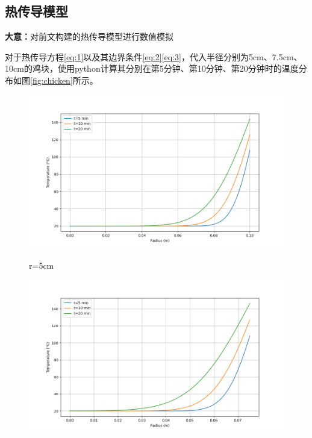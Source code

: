 \documentclass[12pt]{article}
\begin{document}
\subsection{热传导模型}
\begin{summarybox}
	\textbf{大意：}对前文构建的热传导模型进行数值模拟
\end{summarybox}
对于热传导方程\eqref{eq:1}以及其边界条件\eqref{eq:2}\eqref{eq:3}，代入半径分别为5cm、7.5cm、10cm的鸡块，使用python计算其分别在第5分钟、第10分钟、第20分钟时的温度分布如图\ref{fig:chicken}所示。
\begin{figure}[htbp]
	\begin{minipage}{0.32\linewidth}
		\vspace{3pt}
		\centerline{\includegraphics[width=\textwidth]{heat_distribution1.png}}
		\centerline{r=5cm}
	\end{minipage}
	\begin{minipage}{0.32\linewidth}
		\vspace{3pt}
		\centerline{\includegraphics[width=\textwidth]{heat_distribution2.png}}

\end{minipage}
\end{figure}
\end{document}
